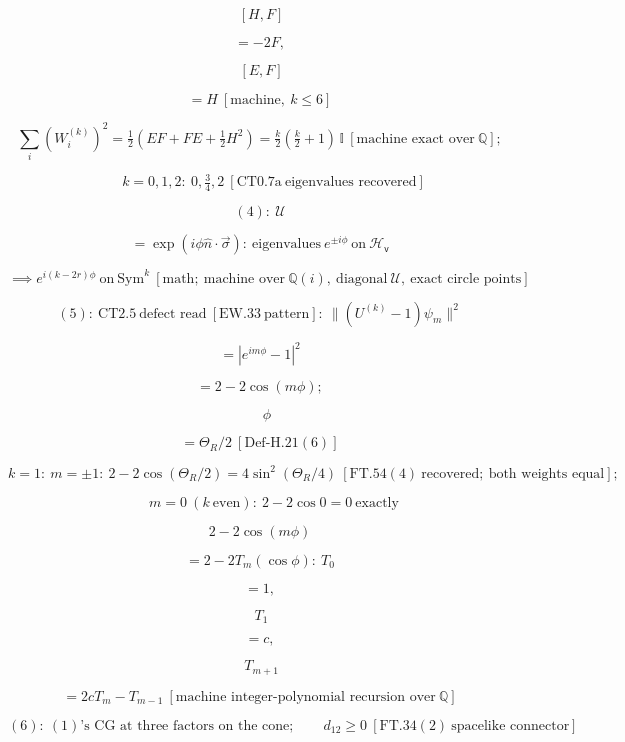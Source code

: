 \begin{theorem}
\[
\ [H,F]
\]

\[
= -2F,
\]

\[
\ [E,F]
\]

\[
= H\ [\text{machine},\ k\le6]
\]

\[
\textstyle\sum_i(W_i^{(k)})^2=\tfrac12(EF+FE+\tfrac12H^2)=\tfrac k2(\tfrac k2+1)\,\mathbb I\ [\text{machine exact over}\ \mathbb Q];
\]

\[
\qquad k=0,1,2:\ 0,\tfrac34,2\ [\mathrm{CT0.7a}\ \text{eigenvalues recovered}]
\]

\[
(4):\ \mathcal U
\]

\[
= \exp(i\phi\hat n\cdot\vec\sigma):\ \text{eigenvalues}\ e^{\pm i\phi}\ \text{on}\ \mathcal H_{\mathsf v}
\]

\[
\implies e^{i(k-2r)\phi}\ \text{on}\ \mathrm{Sym}^k\ [\text{math};\ \text{machine over}\ \mathbb Q(i),\ \text{diagonal}\ \mathcal U,\ \text{exact circle points}]
\]

\[
(5):\ \mathrm{CT2.5}\ \text{defect read}\ [\mathrm{EW.33}\ \text{pattern}]:\ \|(U^{(k)}-1)\psi_m\|^2
\]

\[
= |e^{im\phi}-1|^2
\]

\[
= 2-2\cos(m\phi);
\]

\[
\quad\phi
\]

\[
= \Theta_R/2\ [\mathrm{Def\text{-}H.21}(6)]
\]

\[
k=1:\ m=\pm1:\ 2-2\cos(\Theta_R/2)=4\sin^2(\Theta_R/4)\ [\mathrm{FT.54}(4)\ \text{recovered};\ \text{both weights equal}];
\]

\[
\qquad m=0\ (k\ \text{even}):\ 2-2\cos0=0\ \text{exactly}
\]

\[
2-2\cos(m\phi)
\]

\[
= 2-2T_m(\cos\phi):\ T_0
\]

\[
= 1,
\]

\[
\ T_1
\]

\[
= c,
\]

\[
\ T_{m+1}
\]

\[
= 2cT_m-T_{m-1}\ [\text{machine integer-polynomial recursion over}\ \mathbb Q]
\]

\[
(6):\ (1)\text{'s CG at three factors on the cone};\qquad d_{12}\ge0\ [\mathrm{FT.34}(2)\ \text{spacelike connector}]
\]


\end{theorem}
